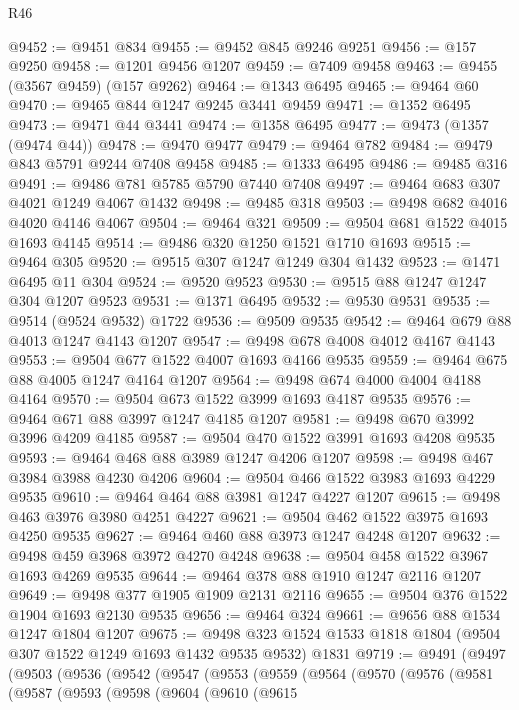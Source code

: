 \begin{lexlean}{R46}
\begin{coremodule}
@9452 := @9451 @834
@9455 := @9452 @845 @9246 @9251
@9456 := @157 @9250
@9458 := @1201 @9456 @1207
@9459 := @7409 @9458
@9463 := @9455 (@3567 @9459) (@157 @9262)
@9464 := @1343 @6495
@9465 := @9464 @60
@9470 := @9465 @844 @1247 @9245 @3441 @9459
@9471 := @1352 @6495
@9473 := @9471 @44 @3441
@9474 := @1358 @6495
@9477 := @9473 (@1357 (@9474 @44))
@9478 := @9470 @9477
@9479 := @9464 @782
@9484 := @9479 @843 @5791 @9244 @7408 @9458
@9485 := @1333 @6495
@9486 := @9485 @316
@9491 := @9486 @781 @5785 @5790 @7440 @7408
@9497 := @9464 @683 @307 @4021 @1249 @4067 @1432
@9498 := @9485 @318
@9503 := @9498 @682 @4016 @4020 @4146 @4067
@9504 := @9464 @321
@9509 := @9504 @681 @1522 @4015 @1693 @4145
@9514 := @9486 @320 @1250 @1521 @1710 @1693
@9515 := @9464 @305
@9520 := @9515 @307 @1247 @1249 @304 @1432
@9523 := @1471 @6495 @11 @304
@9524 := @9520 @9523
@9530 := @9515 @88 @1247 @1247 @304 @1207 @9523
@9531 := @1371 @6495
@9532 := @9530 @9531
@9535 := @9514 (@9524 @9532) @1722
@9536 := @9509 @9535
@9542 := @9464 @679 @88 @4013 @1247 @4143 @1207
@9547 := @9498 @678 @4008 @4012 @4167 @4143
@9553 := @9504 @677 @1522 @4007 @1693 @4166 @9535
@9559 := @9464 @675 @88 @4005 @1247 @4164 @1207
@9564 := @9498 @674 @4000 @4004 @4188 @4164
@9570 := @9504 @673 @1522 @3999 @1693 @4187 @9535
@9576 := @9464 @671 @88 @3997 @1247 @4185 @1207
@9581 := @9498 @670 @3992 @3996 @4209 @4185
@9587 := @9504 @470 @1522 @3991 @1693 @4208 @9535
@9593 := @9464 @468 @88 @3989 @1247 @4206 @1207
@9598 := @9498 @467 @3984 @3988 @4230 @4206
@9604 := @9504 @466 @1522 @3983 @1693 @4229 @9535
@9610 := @9464 @464 @88 @3981 @1247 @4227 @1207
@9615 := @9498 @463 @3976 @3980 @4251 @4227
@9621 := @9504 @462 @1522 @3975 @1693 @4250 @9535
@9627 := @9464 @460 @88 @3973 @1247 @4248 @1207
@9632 := @9498 @459 @3968 @3972 @4270 @4248
@9638 := @9504 @458 @1522 @3967 @1693 @4269 @9535
@9644 := @9464 @378 @88 @1910 @1247 @2116 @1207
@9649 := @9498 @377 @1905 @1909 @2131 @2116
@9655 := @9504 @376 @1522 @1904 @1693 @2130 @9535
@9656 := @9464 @324
@9661 := @9656 @88 @1534 @1247 @1804 @1207
@9675 := @9498 @323 @1524 @1533 @1818 @1804 (@9504 @307 @1522 @1249 @1693 @1432 @9535 @9532) @1831
@9719 := @9491
    (@9497
      (@9503
        (@9536
          (@9542
            (@9547
              (@9553
                (@9559
                  (@9564
                    (@9570
                      (@9576
                        (@9581
                          (@9587
                            (@9593
                              (@9598
                                (@9604
                                  (@9610
                                    (@9615

\end{coremodule}
\end{lexlean}
